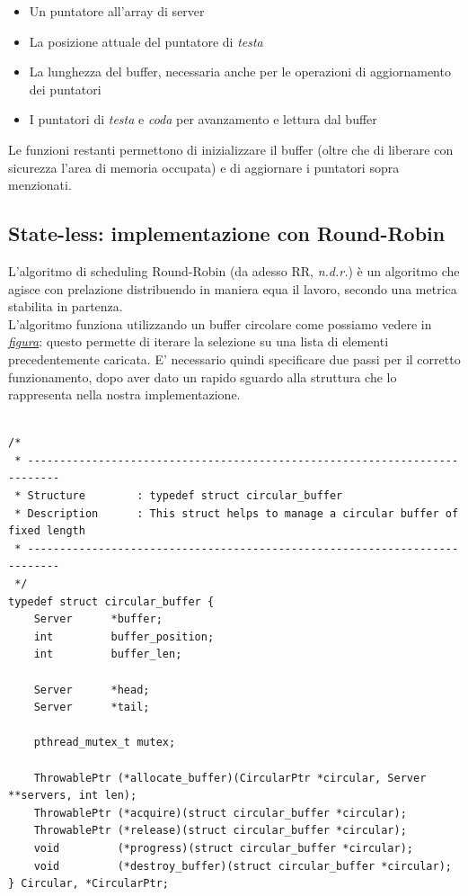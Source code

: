 \documentclass[italian]{tktltiki2}
\begin{document}
	\begin{itemize}
  		\item Un puntatore all'array di server 
  		\item La posizione attuale del puntatore di \emph{testa} 
  		\item La lunghezza del buffer, necessaria anche per le operazioni di aggiornamento dei puntatori
  		\item I puntatori di \emph{testa} e \emph{coda} per avanzamento e lettura dal buffer
	\end{itemize}
	Le funzioni restanti permettono di inizializzare il buffer (oltre che di liberare con sicurezza l'area di memoria occupata) e di aggiornare i puntatori sopra menzionati.\\

\subsection{State-less: implementazione con Round-Robin}
L'algoritmo di scheduling Round-Robin (da adesso RR, \emph{n.d.r.}) è un algoritmo che agisce con prelazione distribuendo in maniera equa il lavoro, secondo una metrica stabilita in partenza. \\
L'algoritmo funziona utilizzando un buffer circolare come possiamo vedere in \hyperref[fig: rrobin_sl]{\emph{figura}}: questo permette di iterare la selezione su una lista di elementi precedentemente caricata. E' necessario quindi specificare due passi per il corretto funzionamento, dopo aver dato un rapido sguardo alla struttura che lo rappresenta nella nostra implementazione.\\\\
\begin{lstlisting}
/*
 * ---------------------------------------------------------------------------
 * Structure        : typedef struct circular_buffer
 * Description      : This struct helps to manage a circular buffer of fixed length
 * ---------------------------------------------------------------------------
 */
typedef struct circular_buffer {
    Server      *buffer;
    int         buffer_position;
    int         buffer_len;
    
    Server      *head;
    Server      *tail;

    pthread_mutex_t mutex;

    ThrowablePtr (*allocate_buffer)(CircularPtr *circular, Server **servers, int len);
    ThrowablePtr (*acquire)(struct circular_buffer *circular);
    ThrowablePtr (*release)(struct circular_buffer *circular);
    void         (*progress)(struct circular_buffer *circular);
    void         (*destroy_buffer)(struct circular_buffer *circular);
} Circular, *CircularPtr;

\end{lstlisting}
\end{document}
